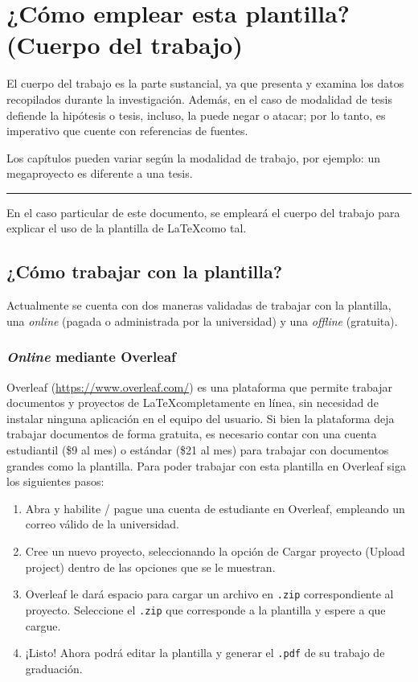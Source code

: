 \chapter{¿Cómo emplear esta plantilla? (Cuerpo del trabajo)}

El cuerpo del trabajo es la parte sustancial, ya que presenta y examina los datos recopilados durante la investigación. Además, en el caso de modalidad de tesis defiende la hipótesis o tesis, incluso, la puede negar o atacar; por lo tanto, es imperativo que cuente con referencias de fuentes.  

Los capítulos pueden variar según la modalidad de trabajo, por ejemplo: un megaproyecto es diferente a una tesis.

\noindent\rule{\linewidth}{0.4pt}

En el caso particular de este documento, se empleará el cuerpo del trabajo para explicar el uso de la plantilla de \LaTeX como tal. 

\section{¿Cómo trabajar con la plantilla?}

Actualmente se cuenta con dos maneras validadas de trabajar con la plantilla, una \textit{online} (pagada o administrada por la universidad) y una \textit{offline} (gratuita).

\subsection{\textit{Online} mediante Overleaf}

Overleaf (\href{https://www.overleaf.com/}{https://www.overleaf.com/}) es una plataforma que permite trabajar documentos y proyectos de \LaTeX completamente en línea, sin necesidad de instalar ninguna aplicación en el equipo del usuario. Si bien la plataforma deja trabajar documentos de forma gratuita, es necesario contar con una cuenta estudiantil (\$9 al mes) o estándar (\$21 al mes) para trabajar con documentos grandes como la plantilla. Para poder trabajar con esta plantilla en Overleaf siga los siguientes pasos:

\begin{enumerate}
    \itemsep 0em

    \item Abra y habilite / pague una cuenta de estudiante en Overleaf, empleando un correo válido de la universidad.

    \item Cree un nuevo proyecto, seleccionando la opción de Cargar proyecto (Upload project) dentro de las opciones que se le muestran.

    \item Overleaf le dará espacio para cargar un archivo en \texttt{.zip} correspondiente al proyecto. Seleccione el \texttt{.zip} que corresponde a la plantilla y espere a que cargue.

    \item ¡Listo! Ahora podrá editar la plantilla y generar el \texttt{.pdf} de su trabajo de graduación.
    
\end{enumerate}

